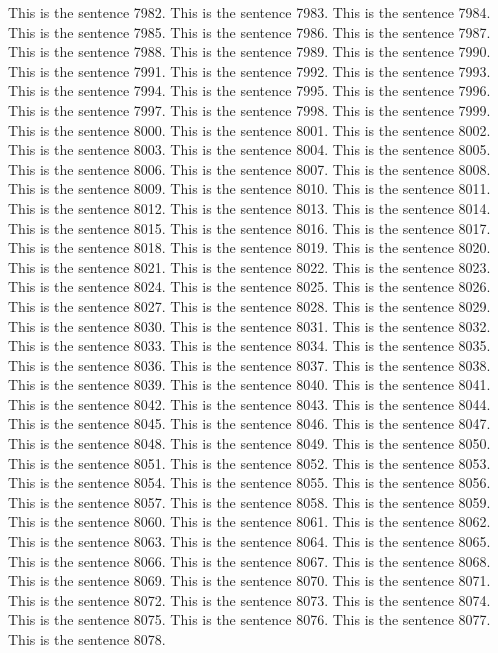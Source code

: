 \documentclass{article}
\begin{document}
This is the sentence 7982.
This is the sentence 7983.
This is the sentence 7984.
This is the sentence 7985.
This is the sentence 7986.
This is the sentence 7987.
This is the sentence 7988.
This is the sentence 7989.
This is the sentence 7990.
This is the sentence 7991.
This is the sentence 7992.
This is the sentence 7993.
This is the sentence 7994.
This is the sentence 7995.
This is the sentence 7996.
This is the sentence 7997.
This is the sentence 7998.
This is the sentence 7999.
This is the sentence 8000.
This is the sentence 8001.
This is the sentence 8002.
This is the sentence 8003.
This is the sentence 8004.
This is the sentence 8005.
This is the sentence 8006.
This is the sentence 8007.
This is the sentence 8008.
This is the sentence 8009.
This is the sentence 8010.
This is the sentence 8011.
This is the sentence 8012.
This is the sentence 8013.
This is the sentence 8014.
This is the sentence 8015.
This is the sentence 8016.
This is the sentence 8017.
This is the sentence 8018.
This is the sentence 8019.
This is the sentence 8020.
This is the sentence 8021.
This is the sentence 8022.
This is the sentence 8023.
This is the sentence 8024.
This is the sentence 8025.
This is the sentence 8026.
This is the sentence 8027.
This is the sentence 8028.
This is the sentence 8029.
This is the sentence 8030.
This is the sentence 8031.
This is the sentence 8032.
This is the sentence 8033.
This is the sentence 8034.
This is the sentence 8035.
This is the sentence 8036.
This is the sentence 8037.
This is the sentence 8038.
This is the sentence 8039.
This is the sentence 8040.
This is the sentence 8041.
This is the sentence 8042.
This is the sentence 8043.
This is the sentence 8044.
This is the sentence 8045.
This is the sentence 8046.
This is the sentence 8047.
This is the sentence 8048.
This is the sentence 8049.
This is the sentence 8050.
This is the sentence 8051.
This is the sentence 8052.
This is the sentence 8053.
This is the sentence 8054.
This is the sentence 8055.
This is the sentence 8056.
This is the sentence 8057.
This is the sentence 8058.
This is the sentence 8059.
This is the sentence 8060.
This is the sentence 8061.
This is the sentence 8062.
This is the sentence 8063.
This is the sentence 8064.
This is the sentence 8065.
This is the sentence 8066.
This is the sentence 8067.
This is the sentence 8068.
This is the sentence 8069.
This is the sentence 8070.
This is the sentence 8071.
This is the sentence 8072.
This is the sentence 8073.
This is the sentence 8074.
This is the sentence 8075.
This is the sentence 8076.
This is the sentence 8077.
This is the sentence 8078.
\end{document}
